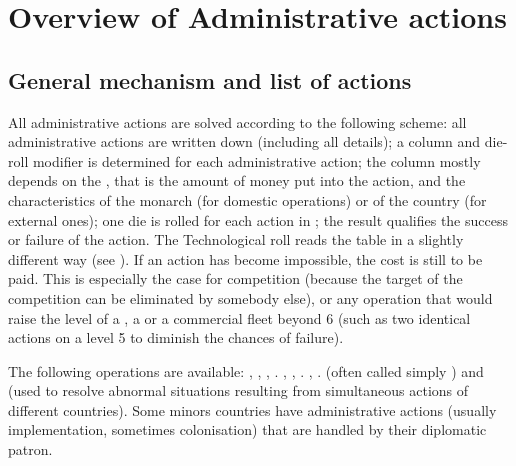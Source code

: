 
\section{Overview of Administrative actions}

\subsection{General mechanism and list of actions}

\aparag[Mechanism] All administrative actions are solved according to the
following scheme: all administrative actions are written down (including all
details); a column and die-roll modifier is determined for each administrative
action; the column mostly depends on the , that is the
amount of money put into the action, and the characteristics of the monarch
(for domestic operations) or of the country (for external ones); one die is
rolled for each action in ; the result
qualifies the success or failure of the action.
\bparag The Technological roll reads the table in a slightly different way
(see ).
\bparag If an action has become impossible, the cost is still to be paid. This
is especially the case for competition (because the target of the competition
can be eliminated by somebody else), or any operation that would raise the
level of a \COL, a \TP or a commercial fleet beyond 6 (such as two identical
actions on a level 5 \COL to diminish the chances of failure).

\label{chExpenses:Administrative Actions}
The following operations are available:
 , , , .
 ,
, .
 ,
.
\bparag[Competitions:]  (often called simply
) and  (used to resolve
abnormal situations resulting from simultaneous actions of different
countries).
 Some minors countries have administrative
actions (usually \TradeFLEET implementation, sometimes colonisation) that are
handled by their diplomatic patron.

